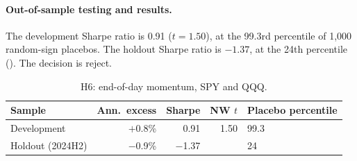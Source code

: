 \documentclass[../main.tex]{subfiles}
\begin{document}
\paragraph{Out-of-sample testing and results.}
The development Sharpe ratio is 0.91 ($t = 1.50$), at the 99.3rd percentile of 1,000 random-sign placebos. The holdout Sharpe ratio is $-1.37$, at the 24th percentile (). The decision is reject.

\begin{table}[tbp]
\centering\small
\caption{H6: end-of-day momentum, SPY and QQQ.}\label{tab:h6}
\begin{tabular}{@{}lrrrl@{}}
\toprule
Sample & Ann.\ excess & Sharpe & NW $t$ & Placebo percentile \\
\midrule
Development & $+$0.8\% & 0.91 & 1.50 & 99.3 \\
Holdout (2024H2) & $-$0.9\% & $-$1.37 & & 24 \\
\bottomrule
\end{tabular}
\end{table}

\end{document}

